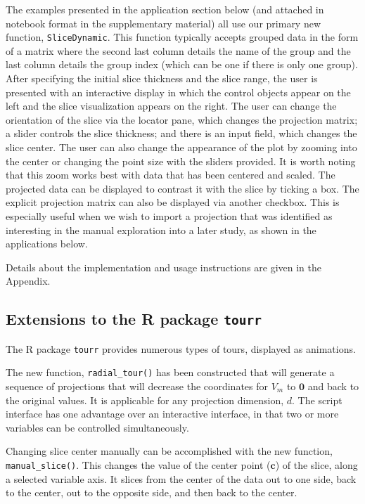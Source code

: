\documentclass[]{interact}
\theoremstyle{plain}%
\theoremstyle{definition}
\theoremstyle{remark}
\begin{document}
The examples presented in the application section below (and attached in
notebook format in the supplementary material) all use our primary new
function, \texttt{SliceDynamic}. This function typically accepts grouped
data in the form of a matrix where the second last column details the
name of the group and the last column details the group index (which can
be one if there is only one group). After specifying the initial slice
thickness and the slice range, the user is presented with an interactive
display in which the control objects appear on the left and the slice
visualization appears on the right. The user can change the orientation
of the slice via the locator pane, which changes the projection matrix;
a slider controls the slice thickness; and there is an input field,
which changes the slice center. The user can also change the appearance
of the plot by zooming into the center or changing the point size with
the sliders provided. It is worth noting that this zoom works best with
data that has been centered and scaled. The projected data can be
displayed to contrast it with the slice by ticking a box. The explicit
projection matrix can also be displayed via another checkbox. This is
especially useful when we wish to import a projection that was
identified as interesting in the manual exploration into a later study,
as shown in the applications below.

Details about the implementation and usage instructions are given in the
Appendix.

\hypertarget{extensions-to-the-r-package-tourr}{%
\subsection{\texorpdfstring{Extensions to the R package
\texttt{tourr}}{Extensions to the R package tourr}}\label{extensions-to-the-r-package-tourr}}

The R package \texttt{tourr} provides numerous types of tours, displayed
as animations.

The new function, \texttt{radial\_tour()} has been constructed that will
generate a sequence of projections that will decrease the coordinates
for \(V_m\) to \(\boldsymbol{0}\) and back to the original values. It is
applicable for any projection dimension, \(d\). The script interface has
one advantage over an interactive interface, in that two or more
variables can be controlled simultaneously.

Changing slice center manually can be accomplished with the new
function, \texttt{manual\_slice()}. This changes the value of the center
point (\(\mathbf{c}\)) of the slice, along a selected variable axis. It
slices from the center of the data out to one side, back to the center,
out to the opposite side, and then back to the center.
\end{document}
